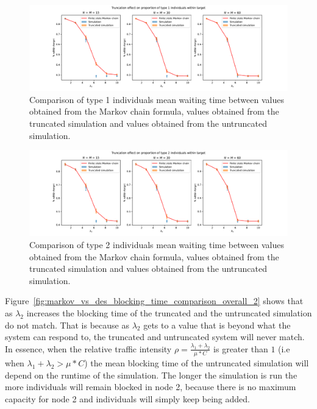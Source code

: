 \begin{figure}[H]
    \includegraphics[width=\textwidth]{chapters/03_queueing_model/img/numeric_results_and_timings/truncation_effect_2/proportion_type_1.pdf}
    \caption{
        Comparison of type 1 individuals mean waiting time between values
        obtained from the Markov chain formula, values obtained from the
        truncated simulation and values obtained from the untruncated
        simulation.
    }
    \label{fig:markov_vs_des_proportion_within_time_comparison_type_1_2}
\end{figure}

\begin{figure}[H]
    \includegraphics[width=\textwidth]{chapters/03_queueing_model/img/numeric_results_and_timings/truncation_effect_2/proportion_type_2.pdf}
    \caption{
        Comparison of type 2 individuals mean waiting time between values
        obtained from the Markov chain formula, values obtained from the
        truncated simulation and values obtained from the untruncated
        simulation.
    }
    \label{fig:markov_vs_des_proportion_within_time_comparison_type_2_2}
\end{figure}


Figure~\ref{fig:markov_vs_des_blocking_time_comparison_overall_2} shows that as
\(\lambda_2\) increases the blocking time of the truncated and the untruncated
simulation do not match.
That is because as \(\lambda_2\) gets to a value that is beyond what the system
can respond to, the truncated and untruncated system will never match.
In essence, when the relative traffic intensity
\(\rho = \frac{\lambda_1 + \lambda_2}{\mu * C}\) is greater than \(1\) (i.e when
\(\lambda_1 + \lambda_2 > \mu * C\)) the mean blocking time of the untruncated
simulation will depend on the runtime of the simulation.
The longer the simulation is run the more individuals will remain blocked in
node 2, because there is no maximum capacity for node 2 and individuals will
simply keep being added.
